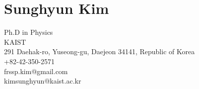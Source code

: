 \section{Sunghyun Kim}\label{sunghyun-kim}

Ph.D in Physics\\
KAIST\\
291 Daehak-ro, Yuseong-gu, Daejeon 34141, Republic of Korea\\
+82-42-350-2571\\
frssp.kim@gmail.com\\
kimsunghyun@kaist.ac.kr
